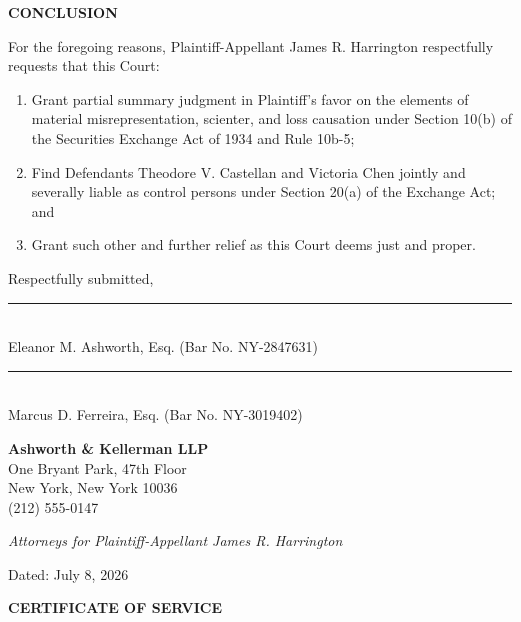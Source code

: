\documentclass[12pt,letterpaper]{article}
\newcommand{\sigline}[1]{%
  \vspace{8pt}%
  \noindent\rule{2.8in}{0.4pt}\\[-2pt]
  {\small\color{midgray}#1}%
}
\begin{document}
{}
\begin{center}
  {\large\bfseries\color{accent}CONCLUSION}
\end{center}

For the foregoing reasons, Plaintiff-Appellant James R. Harrington respectfully requests that this Court:

\begin{enumerate}[label=(\arabic*),leftmargin=2.5em,itemsep=6pt,parsep=0pt]
  \item Grant partial summary judgment in Plaintiff's favor on the elements of material misrepresentation, scienter, and loss causation under Section 10(b) of the Securities Exchange Act of 1934 and Rule 10b-5;
  \item Find Defendants Theodore V. Castellan and Victoria Chen jointly and severally liable as control persons under Section 20(a) of the Exchange Act; and
  \item Grant such other and further relief as this Court deems just and proper.
\end{enumerate}

\vspace{18pt}

\noindent Respectfully submitted,

\vspace{14pt}

\sigline{Eleanor M. Ashworth, Esq. (Bar No. NY-2847631)}

\vspace{14pt}

\sigline{Marcus D. Ferreira, Esq. (Bar No. NY-3019402)}

\vspace{8pt}

\noindent\textbf{Ashworth \& Kellerman LLP}\\
One Bryant Park, 47th Floor\\
New York, New York 10036\\
(212) 555-0147

\vspace{4pt}
\noindent\textit{Attorneys for Plaintiff-Appellant James R. Harrington}

\vspace{4pt}
\noindent Dated: July 8, 2026

\newpage

{}
\begin{center}
  {\large\bfseries\color{accent}CERTIFICATE OF SERVICE}
\end{center}
\end{document}
